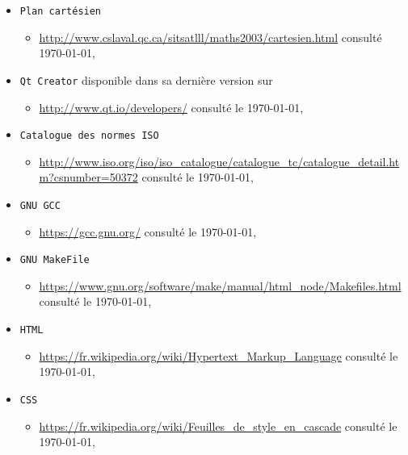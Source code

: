 \documentclass[a4paper,11pt]{report}
\begin{document}
\begin{itemize}
		\begin{itemize}
			\item \url{http://doxygen.org/} consulté \today,\\
		\end{itemize}
	\item[] \texttt{Plan cartésien} 
		\begin{itemize}
			\item \url{http://www.cslaval.qc.ca/sitsatlll/maths2003/cartesien.html} consulté \today,\\
		\end{itemize}
	\item[] \texttt{Qt Creator} disponible dans sa dernière version sur 
		\begin{itemize}
			\item \url{http://www.qt.io/developers/} consulté le \today,\\
		\end{itemize}
	\item[] \texttt{Catalogue des normes ISO} 
		\begin{itemize}
			\item \url{http://www.iso.org/iso/iso_catalogue/catalogue_tc/catalogue_detail.htm?csnumber=50372}
				consulté le \today,\\
		\end{itemize}
	\item[] \texttt{GNU GCC} 
		\begin{itemize}
			\item \url{https://gcc.gnu.org/} consulté le \today,\\
		\end{itemize}
	\item[] \texttt{GNU MakeFile} 
		\begin{itemize}
			\item \url{https://www.gnu.org/software/make/manual/html_node/Makefiles.html} consulté le \today, \\
		\end{itemize}
	\item[] \texttt{HTML} 
		\begin{itemize}
			\item \url{https://fr.wikipedia.org/wiki/Hypertext_Markup_Language} consulté le \today,\\
		\end{itemize}
	\item[] \texttt{CSS} 
		\begin{itemize}
			\item \url{https://fr.wikipedia.org/wiki/Feuilles_de_style_en_cascade} consulté le \today,\\

\end{itemize}
\end{itemize}
\end{document}
